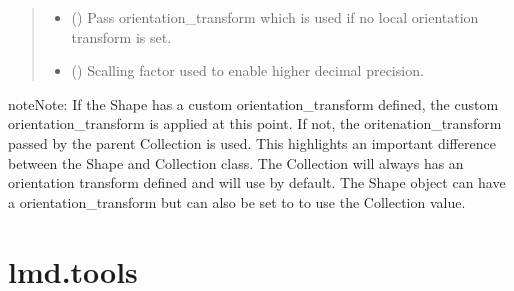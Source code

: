 \documentclass[letterpaper,10pt,english,openany,oneside]{sphinxmanual}
\begin{document}
\begin{fulllineitems}
\begin{fulllineitems}
\begin{quote}
\begin{description}
\begin{itemize}
\item {} 
\sphinxAtStartPar
{} () \textendash{} Pass orientation\_transform which is used if no local orientation transform is set.

\item {} 
\sphinxAtStartPar
{} () \textendash{} Scalling factor used to enable higher decimal precision.

\end{itemize}

\end{description}\end{quote}

\begin{sphinxadmonition}{note}{Note:}
\sphinxAtStartPar
If the Shape has a custom orientation\_transform defined, the custom orientation\_transform is applied at this point. If not, the oritenation\_transform passed by the parent Collection is used. This highlights an important difference between the Shape and Collection class. The Collection will always has an orientation transform defined and will use  by default. The Shape object can have a orientation\_transform but can also be set to  to use the Collection value.
\end{sphinxadmonition}

\end{fulllineitems}


\end{fulllineitems}



\section{lmd.tools}
\label{\detokenize{pages/modules:module-lmd.tools}}\label{\detokenize{pages/modules:lmd-tools}}
\end{document}
